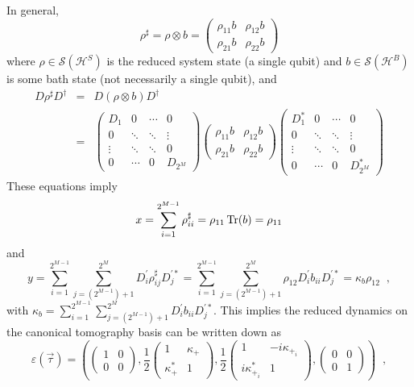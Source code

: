 In general,
\begin{equation}
\label{eqn:formref}
\rho^\sharp = \rho\otimes b = \begin{pmatrix} \rho_{11} b& \rho_{12} b\\ \rho_{21} b&\rho_{22} b\end{pmatrix}
\end{equation}
where $\rho\in\mathcal{S}(\mathcal{H}^S)$ is the reduced system state (a single qubit) and $b\in\mathcal{S}(\mathcal{H}^B)$ is some bath state (not necessarily a single qubit), and
\begin{eqnarray*}
D\rho^\sharp D^\dagger &=& D\left(\rho\otimes b\right)D^\dagger \\
&=& \begin{pmatrix} D_1 & 0 & \cdots & 0\\ 0 & \ddots & \ddots & \vdots \\ \vdots & \ddots & \ddots & 0 \\ 0 & \cdots & 0 & D_{2^M}\end{pmatrix} \begin{pmatrix} \rho_{11} b& \rho_{12} b\\ \rho_{21} b&\rho_{22} b\end{pmatrix}  \begin{pmatrix} D_1^* & 0 & \cdots & 0\\ 0 & \ddots & \ddots & \vdots \\ \vdots & \ddots & \ddots & 0 \\ 0 & \cdots & 0 & D_{2^M}^*\end{pmatrix}
\end{eqnarray*}
These equations imply
$$
x= \sum_{i=1}^{2^{M-1}} \rho^\sharp_{ii} = \rho_{11} \operatorname{Tr}(b) = \rho_{11}
$$
and
$$
y = \sum_{i=1}^{2^{M-1}} \sum_{j=(2^{M-1})+1}^{2^M} D^\prime_{i} \rho^\sharp_{ij} D^{\prime *}_j = \sum_{i=1}^{2^{M-1}} \sum_{j=(2^{M-1})+1}^{2^M} \rho_{12} D^\prime_{i} b_{ii} D^{\prime *}_j = \kappa_b \rho_{12}\;\;,
$$
with $\kappa_b = \sum_{i=1}^{2^{M-1}} \sum_{j=(2^{M-1})+1}^{2^M} D^\prime_{i} b_{ii} D^{\prime *}_j$.  This implies the reduced dynamics on the canonical tomography basis can be written down as
$$
\varepsilon(\vec{\tau}) = \left(\begin{pmatrix}
1&0\\0&0
\end{pmatrix},\frac{1}{2}\begin{pmatrix}
1&\kappa_+\\\kappa_+^*&1
\end{pmatrix},\frac{1}{2}\begin{pmatrix}
1&-i\kappa_{+_i}\\i\kappa_{+_i}^*&1
\end{pmatrix},\begin{pmatrix}
0&0\\0&1
\end{pmatrix}\right)\;\;,
$$
